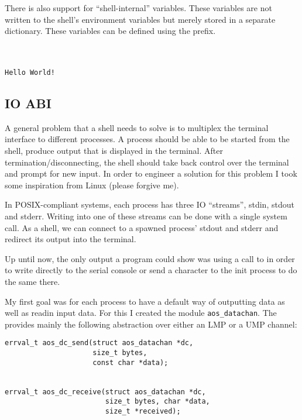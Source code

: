 There is also support for ``shell-internal'' variables. These variables
are not written to the shell's environment variables but merely stored
in a separate dictionary. These variables can be defined using the  prefix.
\begin{mdframed}[style=shell]
\\
\\
\texttt{Hello World!}
\end{mdframed}


\subsection{IO ABI}

A general problem that a shell needs to solve is to multiplex the terminal interface to different
processes. A process should be able to be started from the shell, produce output that is displayed in the terminal. After termination/disconnecting, the shell should take back control over the terminal and prompt for new input. In order to engineer a solution for this problem I took some
inspiration from Linux (please forgive me).

In POSIX-compliant systems, each process has three IO ``streams'', stdin, stdout and stderr.
Writing into one of these streams can be done with a single system call. As a shell, we can connect
to a spawned process' stdout and stderr and redirect its output into the terminal.

Up until now, the only output a program could show was using a call to
 in order to write directly to the serial console or send a character to the
init process to do the same there.

My first goal was for each process to have a default way of outputting data as well as readin input data. For this I created the module \texttt{aos\_datachan}.
The  provides mainly the following abstraction over either an LMP or a UMP channel:


\begin{mdframed}[style=myframe]
\begin{verbatim}
errval_t aos_dc_send(struct aos_datachan *dc,
                     size_t bytes,
                     const char *data);
                     

errval_t aos_dc_receive(struct aos_datachan *dc,
                        size_t bytes, char *data,
                        size_t *received);

\end{verbatim}
\end{mdframed}

